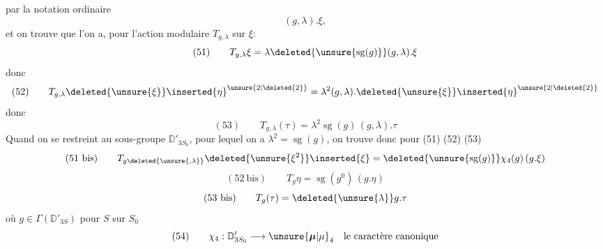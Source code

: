 par la notation ordinaire
\[
(g,\lambda).\xi,
\]
et on trouve que l'on a, pour l'action
modulaire $T_{g,\lambda}$ sur $\xi$:
\[
(51)\qquad T_{g,\lambda}\xi
=\lambda\deleted{\unsure{\operatorname{sg}(g)}}(g,\lambda).\xi
\]
donc
\[
(52)\qquad T_{g,\lambda}\deleted{\unsure{\xi}}\inserted{\eta}^{\unsure{2|\deleted{2}}}
=\lambda^2(g,\lambda).\deleted{\unsure{\xi}}\inserted{\eta}^{\unsure{2|\deleted{2}}}
\]
donc
\[
(53)\qquad T_{g,\lambda}(\tau)=\lambda^2\operatorname{sg}(g)\,(g,\lambda).\tau
\]
Quand on se restreint au sous-groupe
$\mathbb{D}'_{3S_0}$, pour lequel on a $\lambda^2=\operatorname{sg}(g)$, on
trouve donc pour (51) (52) (53)
\[
(51\ \mathrm{bis})\qquad
T_{g\deleted{\unsure{,\lambda}}}\deleted{\unsure{\xi^2}}\inserted{\xi}
=\deleted{\unsure{\operatorname{sg}(g)}}\chi_4(g)\,(g.\xi)
\]
\[
(52\ \mathrm{bis})\qquad T_g\eta=\operatorname{sg}(g^0)\,(g.\eta)
\]
\[
(53\ \mathrm{bis})\qquad T_g(\tau)=\deleted{\unsure{\lambda}}g.\tau
\]
où $g\in\Gamma(\mathbb{D}'_{3S})$ pour $S$ sur $S_0$
\[
(54)\qquad \chi_4:\mathbb{D}'_{3S_0}\longrightarrow\unsure{\boldsymbol{\mu}|\mu}_4
\quad\text{le caractère canonique}
\]
